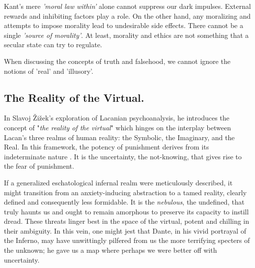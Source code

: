 \documentclass[11pt,a4]{article}
\begin{document}
Kant's mere \textit{'moral law within'} alone cannot suppress our
dark impulses. External rewards and inhibiting factors play a role.
On the other hand,  any moralizing and attempts to impose morality
lead to undesirable side effects. There cannot be
a single \textit{'source of morality'}.
At least, morality and ethics are not something that a
secular state can try to regulate.

When discussing the concepts of truth and falsehood, we cannot
ignore the notions of 'real' and 'illusory'.


    \subsection{The Reality of the Virtual.} \label{reality}

        In Slavoj Žižek's exploration of Lacanian psychoanalysis, he introduces
        the concept of "\textit{the reality of the virtual}" which hinges on the interplay between
        Lacan's three realms of human reality: the Symbolic, the Imaginary, and the Real.
        In this framework, the potency of punishment derives from its indeterminate
        nature \cite{Borretzen2012-tx}. It is the uncertainty, the not-knowing, that gives rise
        to the fear of punishment.

        \par
        If a generalized eschatological infernal realm were meticulously described, it might transition
        from an anxiety-inducing abstraction to a tamed reality, clearly defined and consequently less
        formidable. It is the \textit{nebulous}, the undefined, that truly haunts us and ought to remain
        amorphous to preserve its capacity to instill dread. These threats linger best in the space of
        the virtual, potent and chilling in their ambiguity. In this vein, one might jest that Dante,
        in his vivid portrayal of the Inferno, may have unwittingly pilfered from us the more terrifying
        specters of the unknown; he gave us a map where perhaps we were better off with uncertainty.
\end{document}
